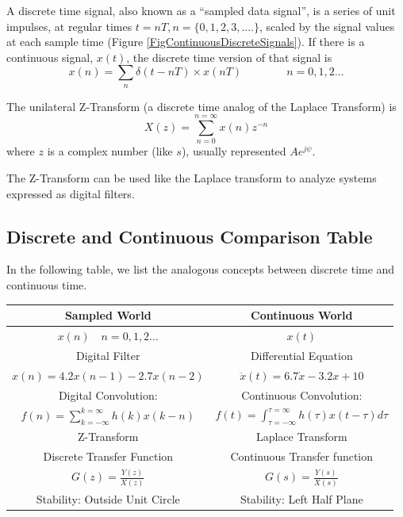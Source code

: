 A discrete time signal, also known as a ``sampled data signal'', is a series of unit impulses,
at regular times $t=nT, n=\{0,1,2,3,....\}$,
scaled by the signal values at each sample time (Figure \ref{FigContinuousDiscreteSignals}).
If there is a continuous signal, $x(t)$, the discrete time version of that signal is
\[
x(n) = \sum_n \delta(t-nT)\times x(nT)  \qquad \qquad n = 0,1,2 \dots
\]

The unilateral Z-Transform (a discrete time analog of the Laplace Transform) is
\[
X(z) = \sum_{n=0}^{n=\infty} x(n)z^{-n}
\]
where $z$ is a complex number (like $s$), usually represented $Ae^{j\psi}$.

The Z-Transform can be used like the Laplace transform to analyze systems expressed as digital filters.


\subsection{Discrete and Continuous Comparison Table}

In the following table, we list the analogous concepts between discrete time and continuous time.

\renewcommand\arraystretch{1.75}%
\begin{centering}
\begin{tabular}{c|c}
{\bf Sampled World  }         &  {\bf Continuous World  }   \\ \hline
$x(n) \quad n= 0,1,2 \dots$                  &     $x(t)$           \\
Digital Filter          &  Differential Equation   \\
$x(n) = 4.2x(n-1)-2.7x(n-2)$&   $\ddot{x}(t) = 6.7\dot{x} -3.2{x} + 10 $\\
Digital Convolution:         &   Continuous Convolution:    \\
  $f(n) = \sum_{k=-\infty}^{k=\infty} h(k)x(k-n)$  &
  $f(t) = \int_{\tau=-\infty}^{\tau=\infty} h(\tau)x(t-\tau) d\tau$  \\
Z-Transform             &  Laplace Transform   \\
Discrete Transfer Function  &  Continuous Transfer function   \\
$G(z) = \frac{Y(z)}{X(z)}$   &  $G(s) = \frac{Y(s)}{X(s)}$  \\
Stability:  Outside Unit Circle  & Stability: Left Half Plane   \\
\end{tabular}
\end{centering}


